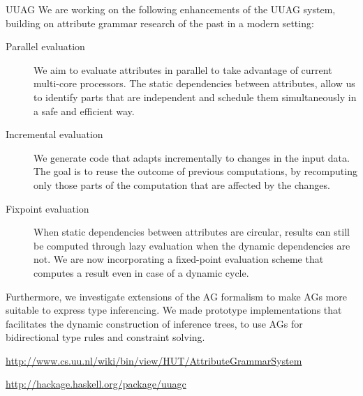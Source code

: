 \begin{hcarentry}[updated]{UUAG}
We are working on the following enhancements of the UUAG system, building on attribute grammar research of the past in a modern setting:
\begin{description}
\item[Parallel evaluation]
  We aim to evaluate attributes in parallel to take advantage of current multi-core processors.
  The static dependencies between attributes, allow us to identify
  parts that are independent and schedule them simultaneously in a safe and efficient way.
\item[Incremental evaluation]
  We generate code that adapts incrementally to changes in the input data. The goal is to reuse
  the outcome of previous computations, by recomputing only those parts of the computation that
  are affected by the changes.
\item[Fixpoint evaluation]
  When static dependencies between attributes are circular, results can still be computed through
  lazy evaluation when the dynamic dependencies are not. We are now incorporating a fixed-point
  evaluation scheme that computes a result even in case of a dynamic cycle.
\end{description}
Furthermore, we investigate extensions of the AG formalism to make AGs more suitable to express
type inferencing. We made prototype implementations that facilitates
the dynamic construction of inference trees, to use AGs for bidirectional
type rules and constraint solving.

\FurtherReading
\begin{compactitem}
\item
  \url{http://www.cs.uu.nl/wiki/bin/view/HUT/AttributeGrammarSystem}
\item
  \url{http://hackage.haskell.org/package/uuagc}
\end{compactitem}
\end{hcarentry}
